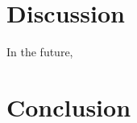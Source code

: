 \documentclass[11pt, titlepage]{article}
\begin{document}
\section{Discussion}

In the future, 

\section{Conclusion}






\printbibliography
\end{document}
